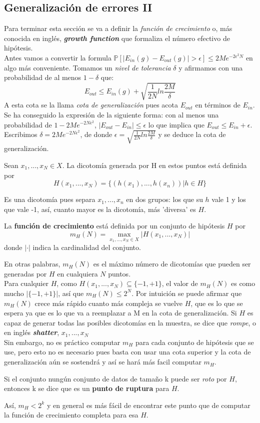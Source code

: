 \subsection{Generalización de errores II}
Para terminar esta sección se va a definir la \textit{función de crecimiento} o, más conocida en inglés, \textbf{\textit{growth function}} que formaliza el número efectivo de hipótesis.\\
Antes vamos a convertir la formula $\mathbb{P}[\vert E_{in}(g)-E_{out}(g) \vert > \epsilon] \leq 2Me^{-2\epsilon^{2}N}$ en algo más conveniente. Tomamos un \textit{nivel de tolerancia} $\delta$ y afirmamos con una probabilidad de al menos $1 - \delta$ que:
\[ E_{out} \leq E_{in}(g) + \sqrt{\frac{1}{2N} ln \frac{2M}{\delta}} \] 
A esta cota se la llama \textit{cota de generalización} pues acota $E_{out}$ en términos de $E_{in}$. Se ha conseguido la expresión de la siguiente forma: con al menos una probabilidad de $1 - 2Me^{-2N \epsilon^{2}}$, $\vert E_{out} - E_{in} \vert \leq \epsilon $ lo que implica que $E_{out} \leq E_{in} + \epsilon$. Escribimos $\delta = 2Me^{-2N\epsilon^{2}}$, de donde $\epsilon=\sqrt{\frac{1}{2N}ln\frac{2M}{\delta}}$ y se deduce la cota de generalización.
\begin{definicion}
Sean $x_{1},...,x_{N} \in X$. La dicotomía generada por H en estos puntos está definida por  \[ H(x_{1},...,x_{N})= \lbrace (h(x_{1}),...,h(x_{n})) \vert h \in H \rbrace \]
\end{definicion}
Es una dicotomía pues separa $x_{1},...,x_{n}$ en dos grupos: los que su $h$ vale 1 y los que vale -1, así, cuanto mayor es la dicotomía, más 'diversa' es $H$.
\begin{definicion}
La \textbf{función de crecimiento} está definida por un conjunto de hipótesis $H$ por \[ m_{H}(N)=\max_{x_{1},...,x_{N} \in X} \vert H(x_{1},...,x_{N}) \vert \]
donde $\vert \cdot \vert$ indica la cardinalidad del conjunto.
\end{definicion}
En otras palabras, $m_{H}(N)$ es el máximo número de dicotomías que pueden ser generadas por $H$ en cualquiera $N$ puntos.\\
Para cualquier $H$, como $H(x_{1},...,x_{N}) \subseteq \lbrace -1,+1 \rbrace$, el valor de $m_{H}(N)$ es como mucho $\vert \lbrace -1,+1 \rbrace \vert$, así que $m_{H}(N) \leq 2^{N}$. Por intuición se puede afirmar que $m_{H}(N)$ crece más rápido cuanto más compleja se vuelve $H$, que es lo que se espera ya que es lo que va a reemplazar a M en la cota de generalización. Si $H$ es capaz de generar todas las posibles dicotomías en la muestra, se dice que \textit{rompe}, o en inglés \textbf{\textit{shatter}}, $x_{1},...,x_{N}$\\
Sin embargo, no es práctico computar $m_{H}$ para cada conjunto de hipótesis que se use, pero esto no es necesario pues basta con usar una cota superior y la cota de generalización aún se sostendrá y así se hará más facil computar $m_{H}$.
\begin{definicion}
Si el conjunto nungún conjunto de datos de tamaño k puede ser \textit{roto} por $H$, entonces k se dice que es un \textbf{punto de ruptura} para $H$.
\end{definicion}
Así, $m_{H} < 2^{k}$ y en general es más fácil de encontrar este punto que de computar la función de crecimiento completa para esa $H$. 
